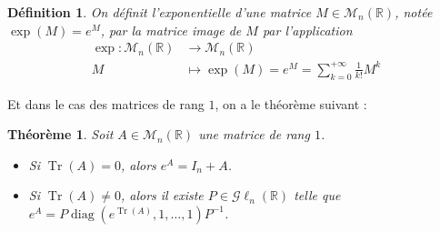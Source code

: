 \documentclass[a4paper]{article}
\newtheorem*{theorem}{Théorème}
\newtheorem*{definition}{Définition}
\begin{document}
\begin{definition}
    On définit l'exponentielle d'une matrice $M \in \mathcal{M}_{n}(\mathbb{R})$, notée $\exp(M) = e^M$, par la matrice image de $M$ par l'application
    \begin{align*}
    \exp : \mathcal{M}_{n}(\mathbb{R}) &\longrightarrow \mathcal{M}_{n}(\mathbb{R})\\
    M &\longmapsto \exp(M) = e^M = \sum_{k=0}^{+\infty} \frac{1}{k!}M^k
    \end{align*}
\end{definition}

Et dans le cas des matrices de rang $1$, on a le théorème suivant :

\begin{theorem}
    Soit $A \in \mathcal{M}_{n}(\mathbb{R})$ une matrice de rang $1$.
    \begin{itemize}
        \item Si $\operatorname{Tr}(A) = 0$, alors $e^A = I_n +A$.
        \item Si $\operatorname{Tr}(A) \neq 0$, alors il existe $P \in \mathcal{G}\ell_n(\mathbb{R})$ telle que $e^A = P\operatorname{diag}(e^{\operatorname{Tr}(A)}, 1, \dots, 1)P^{-1}$.
    \end{itemize}
\end{theorem}
\end{document}
